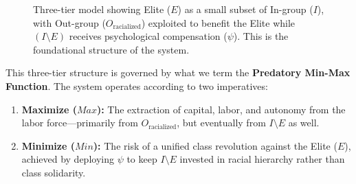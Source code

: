 \documentclass[12pt]{article}
\begin{document}
\begin{figure}[htbp]
\centering
{}
\caption{Three-tier model showing Elite ($E$) as a small subset of In-group ($I$), with Out-group ($O_{\text{racialized}}$) exploited to benefit the Elite while $(I \setminus E)$ receives psychological compensation ($\psi$). This is the foundational structure of the system.}
\label{fig:elite_model}
\end{figure}

This three-tier structure is governed by what we term the \textbf{Predatory Min-Max Function}. The system operates according to two imperatives:

\begin{enumerate}
    \item \textbf{Maximize ($Max$):} The extraction of capital, labor, and autonomy from the labor force---primarily from $O_{\text{racialized}}$, but eventually from $I \setminus E$ as well.
    \item \textbf{Minimize ($Min$):} The risk of a unified class revolution against the Elite ($E$), achieved by deploying $\psi$ to keep $I \setminus E$ invested in racial hierarchy rather than class solidarity.
\end{enumerate}
\end{document}
